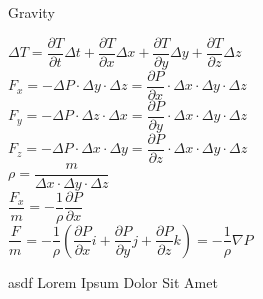 \documentclass[11pt]{beamer}
\begin{document}
\begin{frame}{Gravity}\footnotesize

$ \Delta T = \dfrac{\partial T}{\partial t} \Delta t 
+ \dfrac{\partial T}{\partial x} \Delta x 
+ \dfrac{\partial T}{\partial y} \Delta y 
+ \dfrac{\partial T}{\partial z} \Delta z $\\

$ F_{x} = - \Delta P \cdot \Delta y \cdot \Delta z 
= \dfrac{\partial P}{\partial x} \cdot \Delta x \cdot \Delta y \cdot \Delta z $\\

$ F_{y} = - \Delta P \cdot \Delta z \cdot \Delta x 
= \dfrac{\partial P}{\partial y} \cdot \Delta x \cdot \Delta y \cdot \Delta z $\\

$ F_{z} = - \Delta P \cdot \Delta x \cdot \Delta y 
= \dfrac{\partial P}{\partial z} \cdot \Delta x \cdot \Delta y \cdot \Delta z $\\

$ \rho = \dfrac {m}{\Delta x \cdot \Delta y \cdot \Delta z} $ \\

$ \dfrac {F_{x}}{m} = - \dfrac{1}{\rho} \dfrac{\partial P}{\partial x} $ \\

$ \dfrac {F}{m} = - \dfrac{1}{\rho} \left( \dfrac{\partial P}{\partial x} i + \dfrac{\partial P}{\partial y} j + \dfrac{\partial P}{\partial z} k \right) 
= - \dfrac{1}{\rho} \nabla P$ \\

\end{frame}


\begin{frame}{4}
	
	\begin{block}{asdf}
		Lorem Ipsum Dolor Sit Amet
	\end{block}
\end{frame}
\end{document}
